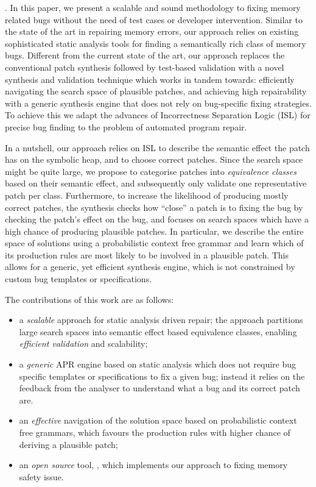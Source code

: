. In this paper, we present a scalable and sound methodology to fixing memory related bugs without the need of test cases or developer intervention. Similar to the state of the art in repairing memory errors, our approach relies on existing sophisticated static analysis tools for finding a semantically rich class of memory bugs. Different from the current state of the art, our approach replaces the conventional patch synthesis followed by test-based validation with a novel synthesis and validation technique which works in tandem towards: efficiently navigating the search space of plausible patches, 
and achieving high repairability with a generic synthesis engine that does not rely on bug-specific fixing strategies.
To achieve this we adapt the advances of Incorrectness Separation Logic (ISL) \cite{Le2022,Raad2020} for precise bug finding 
to the problem of automated program repair. 

In a nutshell, our approach relies on ISL to describe the semantic effect the patch has on the symbolic heap, and to choose correct patches. Since the search space might be quite large, we propose to categorise patches into \emph{equivalence classes} based on their semantic effect, and subsequently only validate one representative patch per class. 
Furthermore, to increase the likelihood of producing mostly correct patches, the synthesis 
checks how ``close'' a patch is to fixing the bug by checking the patch's effect on the bug, and focuses on search spaces which have a high chance of producing plausible patches. 
In particular, we describe the entire space of solutions using a probabilistic context free grammar and learn which of its production rules are most likely to be involved in a plausible patch. 
This allows for a generic, yet efficient synthesis engine, which is not constrained by custom bug templates or specifications. 
\vspace{1em}

The contributions of this work are as follows:
\begin{itemize}
\item a {\em scalable} approach for static analysis driven repair; the approach partitions large search spaces into semantic effect based equivalence classes, enabling \emph{efficient validation} and scalability;

\item a \emph{generic} APR engine based on static analysis which does not require  bug specific templates or specifications to fix a given bug; instead it relies on the feedback from the analyser to understand what a bug and its correct patch are.

\item an \emph{effective} navigation of the solution space based on probabilistic context free grammars, which favours the production rules with higher chance of deriving a plausible patch;
 
\item an \emph{open source} tool, \tool, which implements our approach to fixing memory safety issue. 
\end{itemize}
